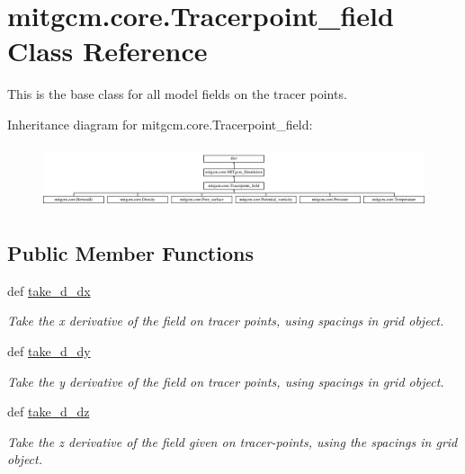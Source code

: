 \hypertarget{classmitgcm_1_1core_1_1Tracerpoint__field}{}\section{mitgcm.\+core.\+Tracerpoint\+\_\+field Class Reference}
\label{classmitgcm_1_1core_1_1Tracerpoint__field}


This is the base class for all model fields on the tracer points.  


Inheritance diagram for mitgcm.\+core.\+Tracerpoint\+\_\+field\+:\begin{figure}[H]
\begin{center}
\leavevmode
\includegraphics[height=1.866667cm]{classmitgcm_1_1core_1_1Tracerpoint__field}
\end{center}
\end{figure}
\subsection*{Public Member Functions}
\begin{DoxyCompactItemize}
\item 
def \hyperlink{classmitgcm_1_1core_1_1Tracerpoint__field_a4e5ca6800530f2c8da4bc3d21ef4e50d}{take\+\_\+d\+\_\+dx}
\begin{DoxyCompactList}\small\item\em Take the x derivative of the field on tracer points, using spacings in grid object. \end{DoxyCompactList}\item 
def \hyperlink{classmitgcm_1_1core_1_1Tracerpoint__field_a5292f8f5c2110f476329806bee9315bf}{take\+\_\+d\+\_\+dy}
\begin{DoxyCompactList}\small\item\em Take the y derivative of the field on tracer points, using spacings in grid object. \end{DoxyCompactList}\item 
def \hyperlink{classmitgcm_1_1core_1_1Tracerpoint__field_aa54bc7f1fe31f946b3ed13cc1c66f22e}{take\+\_\+d\+\_\+dz}
\begin{DoxyCompactList}\small\item\em Take the z derivative of the field given on tracer-\/points, using the spacings in grid object. \end{DoxyCompactList}\end{DoxyCompactItemize}
